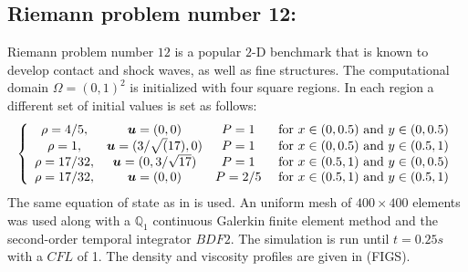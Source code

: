 \subsection{Riemann problem number 12:} \label{sec:2d-riemann-pb-12}
Riemann problem number $12$ \cite{RP12} is a popular $2$-D benchmark that is known to develop contact and shock waves, as well as fine structures. The computational domain $\Omega = (0,1)^2$ is initialized with four square regions. In each region a different set of initial values is set as follows:
\begin{equation}
\left\{
\begin{array}{cccc}
\rho = 4/5, & \boldsymbol u = (0, 0) & P = 1 & \text{ for } x \in (0, 0.5) \text{ and } y \in (0, 0.5) \\
\rho = 1, & \boldsymbol u = (3/\sqrt(17), 0) & P = 1 & \text{ for } x \in (0, 0.5) \text{ and } y \in (0.5, 1) \\
\rho = 17/32, & \boldsymbol u = (0,3/\sqrt{17}) & P = 1 & \text{ for } x \in (0.5, 1) \text{ and } y \in (0, 0.5) \\
\rho = 17/32, & \boldsymbol u = (0, 0) & P = 2/5 & \text{ for } x \in (0.5, 1) \text{ and } y \in (0.5, 1) \\
\end{array}
\right. \nonumber
\end{equation}
The same equation of state as in  is used. An uniform mesh of $400 \times 400 $ elements was used along with a $\mathbb Q_1$ continuous Galerkin finite element method and the second-order temporal integrator $BDF2$. The simulation is run until $t=0.25s$ with a $CFL$ of 1. The density and viscosity profiles are given in (FIGS). 
